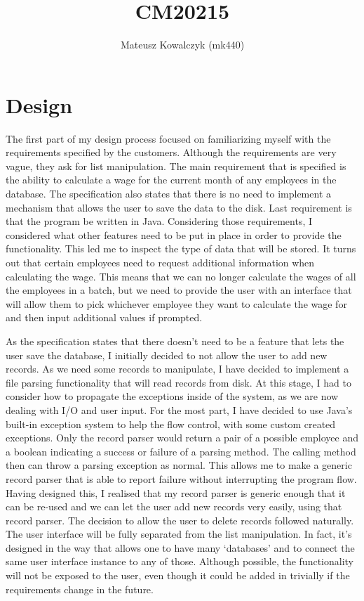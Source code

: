 \documentclass{report}
\begin{document}
\title{CM20215}
\author{Mateusz Kowalczyk (mk440)}
\maketitle
\section*{Design}

The first part of my design process focused on familiarizing myself with the requirements specified by the customers. Although the requirements are very vague, they ask for list manipulation. The main requirement that is specified is the ability to calculate a wage for the current month of any employees in the database. The specification also states that there is no need to implement a mechanism that allows the user to save the data to the disk. Last requirement is that the program be written in Java.  Considering those requirements, I considered what other features need to be put in place in order to provide the functionality. This led me to inspect the type of data that will be stored. It turns out that certain employees need to request additional information when calculating the wage. This means that we can no longer calculate the wages of all the employees in a batch, but we need to provide the user with an interface that will allow them to pick whichever employee they want to calculate the wage for and then input additional values if prompted.

As the specification states that there doesn't need to be a feature that lets the user save the database, I initially decided to not allow the user to add new records. As we need some records to manipulate, I have decided to implement a file parsing functionality that will read records from disk. At this stage, I had to consider how to propagate the exceptions inside of the system, as we are now dealing with I/O and user input. For the most part, I have decided to use Java's built-in exception system to help the flow control, with some custom created exceptions. Only the record parser would return a pair of a possible employee and a boolean indicating a success or failure of a parsing method. The calling method then can throw a parsing exception as normal. This allows me to make a generic record parser that is able to report failure without interrupting the program flow. Having designed this, I realised that my record parser is generic enough that it can be re-used and we can let the user add new records very easily, using that record parser. The decision to allow the user to delete records followed naturally. The user interface will be fully separated from the list manipulation. In fact, it's designed in the way that allows one to have many `databases' and to connect the same user interface instance to any of those. Although possible, the functionality will not be exposed to the user, even though it could be added in trivially if the requirements change in the future.
\end{document}
